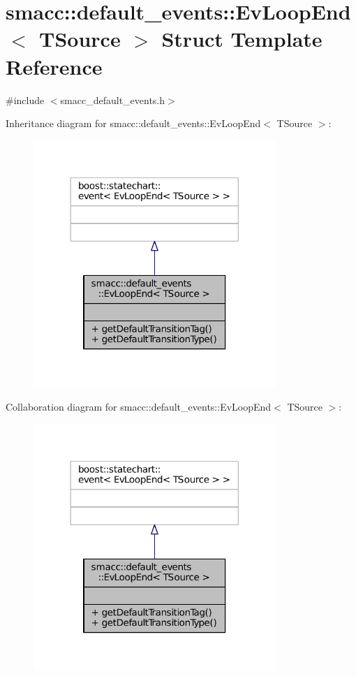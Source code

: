 \hypertarget{structsmacc_1_1default__events_1_1EvLoopEnd}{}\section{smacc\+:\+:default\+\_\+events\+:\+:Ev\+Loop\+End$<$ T\+Source $>$ Struct Template Reference}
\label{structsmacc_1_1default__events_1_1EvLoopEnd}


{\ttfamily \#include $<$smacc\+\_\+default\+\_\+events.\+h$>$}



Inheritance diagram for smacc\+:\+:default\+\_\+events\+:\+:Ev\+Loop\+End$<$ T\+Source $>$\+:
\nopagebreak
\begin{figure}[H]
\begin{center}
\leavevmode
\includegraphics[width=260pt]{structsmacc_1_1default__events_1_1EvLoopEnd__inherit__graph}
\end{center}
\end{figure}


Collaboration diagram for smacc\+:\+:default\+\_\+events\+:\+:Ev\+Loop\+End$<$ T\+Source $>$\+:
\nopagebreak
\begin{figure}[H]
\begin{center}
\leavevmode
\includegraphics[width=260pt]{structsmacc_1_1default__events_1_1EvLoopEnd__coll__graph}
\end{center}
\end{figure}
